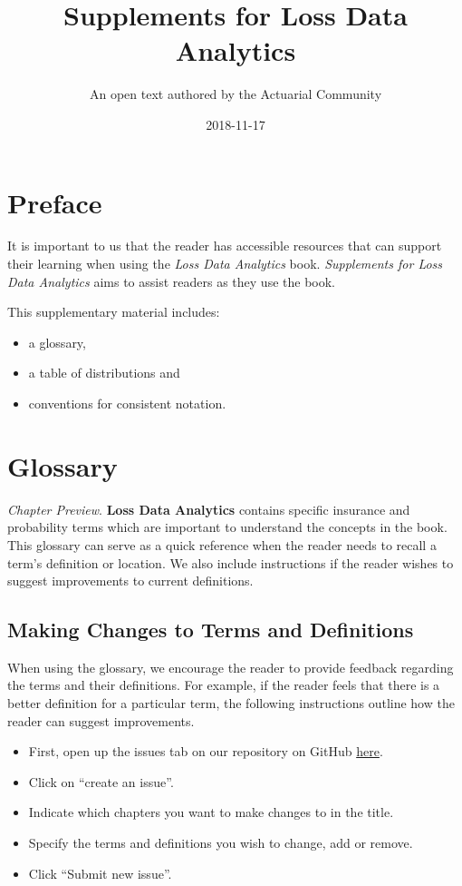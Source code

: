 \documentclass[]{book}
\title{Supplements for Loss Data Analytics}
\author{An open text authored by the Actuarial Community}
\date{2018-11-17}
\providecommand{\tightlist}{%
  \setlength{\itemsep}{0pt}\setlength{\parskip}{0pt}}
\theoremstyle{definition}
\theoremstyle{definition}
\theoremstyle{definition}
\theoremstyle{remark}
\begin{document}
\maketitle

{
\setcounter{tocdepth}{1}
\tableofcontents
}
\chapter*{Preface}\label{preface}

It is important to us that the reader has accessible resources that can
support their learning when using the \emph{Loss Data Analytics} book.
\emph{Supplements for Loss Data Analytics} aims to assist readers as
they use the book.

This supplementary material includes:

\begin{itemize}
\tightlist
\item
  a glossary,
\item
  a table of distributions and
\item
  conventions for consistent notation.
\end{itemize}

\chapter{Glossary}\label{glossary}

\emph{Chapter Preview}. \textbf{Loss Data Analytics} contains specific
insurance and probability terms which are important to understand the
concepts in the book. This glossary can serve as a quick reference when
the reader needs to recall a term's definition or location. We also
include instructions if the reader wishes to suggest improvements to
current definitions.

\section{Making Changes to Terms and
Definitions}\label{making-changes-to-terms-and-definitions}

When using the glossary, we encourage the reader to provide feedback
regarding the terms and their definitions. For example, if the reader
feels that there is a better definition for a particular term, the
following instructions outline how the reader can suggest improvements.

\begin{itemize}
\tightlist
\item
  First, open up the issues tab on our repository on GitHub
  \href{https://github.com/alyaanuval/LDAGlossary/issues}{here}.
\item
  Click on ``create an issue''.
\item
  Indicate which chapters you want to make changes to in the title.
\item
  Specify the terms and definitions you wish to change, add or remove.
\item
  Click ``Submit new issue''.
\end{itemize}
\end{document}
